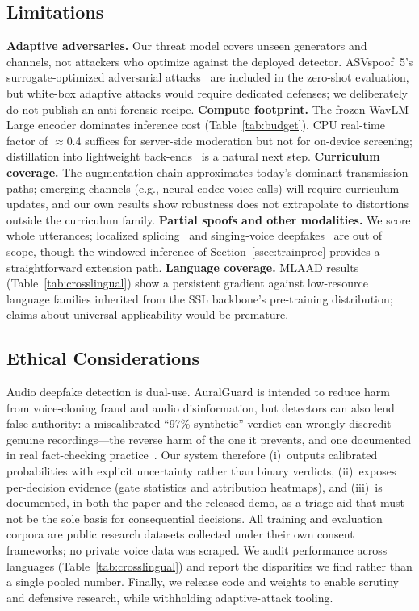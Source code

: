 \subsection{Limitations}

\textbf{Adaptive adversaries.} Our threat model covers unseen generators and channels,
not attackers who optimize against the deployed detector. ASVspoof~5's
surrogate-optimized adversarial attacks~\cite{wang2025asvspoof5journal} are included in
the zero-shot evaluation, but white-box adaptive attacks would require dedicated
defenses; we deliberately do not publish an anti-forensic recipe.
\textbf{Compute footprint.} The frozen WavLM-Large encoder dominates inference cost
(Table~\ref{tab:budget}). CPU real-time factor of $\approx$0.4 suffices for server-side
moderation but not for on-device screening; distillation into lightweight
back-ends~\cite{liu2025nes2net} is a natural next step.
\textbf{Curriculum coverage.} The augmentation chain approximates today's dominant
transmission paths; emerging channels (e.g., neural-codec voice calls) will require
curriculum updates, and our own results show robustness does not extrapolate to
distortions outside the curriculum family.
\textbf{Partial spoofs and other modalities.} We score whole utterances; localized
splicing~\cite{luong2024llamapartialspoof} and singing-voice
deepfakes~\cite{zang2024singfake} are out of scope, though the windowed inference of
Section~\ref{ssec:trainproc} provides a straightforward extension path.
\textbf{Language coverage.} MLAAD results (Table~\ref{tab:crosslingual}) show a
persistent gradient against low-resource language families inherited from the SSL
backbone's pre-training distribution; claims about universal applicability would be
premature.

\subsection{Ethical Considerations}

Audio deepfake detection is dual-use. AuralGuard is intended to reduce harm from
voice-cloning fraud and audio disinformation, but detectors can also lend false
authority: a miscalibrated ``97\% synthetic'' verdict can wrongly discredit genuine
recordings---the reverse harm of the one it prevents, and one documented in real
fact-checking practice~\cite{chandra2025deepfakeeval}. Our system therefore
(i)~outputs calibrated probabilities with explicit uncertainty rather than binary
verdicts, (ii)~exposes per-decision evidence (gate statistics and attribution
heatmaps), and (iii)~is documented, in both the paper and the released demo, as a
triage aid that must not be the sole basis for consequential decisions. All training
and evaluation corpora are public research datasets collected under their own consent
frameworks; no private voice data was scraped. We audit performance across languages
(Table~\ref{tab:crosslingual}) and report the disparities we find rather than a single
pooled number. Finally, we release code and weights to enable scrutiny and defensive
research, while withholding adaptive-attack tooling.
